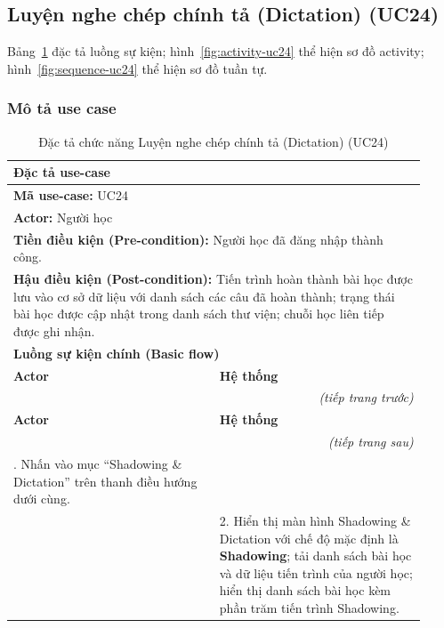\subsection{Luyện nghe chép chính tả (Dictation) (UC24)}
Bảng~\ref{tab:uc24_spec} đặc tả luồng sự kiện; hình~\ref{fig:activity-uc24} thể hiện sơ đồ activity; hình~\ref{fig:sequence-uc24} thể hiện sơ đồ tuần tự.
\subsubsection{Mô tả use case}
\renewcommand{\arraystretch}{1.3}
\begin{longtable}{|p{0.46\linewidth}|p{0.46\linewidth}|}
    \caption{Đặc tả chức năng Luyện nghe chép chính tả (Dictation) (UC24)} \label{tab:uc24_spec} \\
    \hline
    \multicolumn{2}{|l|}{\textbf{Đặc tả use-case}} \\ \hline
    \multicolumn{2}{|l|}{\textbf{Mã use-case:} UC24} \\ \hline
    \multicolumn{2}{|l|}{\textbf{Actor:} Người học} \\ \hline
    \multicolumn{2}{|p{0.88\linewidth}|}{\textbf{Tiền điều kiện (Pre-condition):} Người học đã đăng nhập thành công.} \\ \hline
    \multicolumn{2}{|p{0.88\linewidth}|}{\textbf{Hậu điều kiện (Post-condition):} Tiến trình hoàn thành bài học được lưu vào cơ sở dữ liệu với danh sách các câu đã hoàn thành; trạng thái bài học được cập nhật trong danh sách thư viện; chuỗi học liên tiếp được ghi nhận.} \\ \hline
    \multicolumn{2}{|l|}{\textbf{Luồng sự kiện chính (Basic flow)}} \\ \hline
    \textbf{Actor} & \textbf{Hệ thống} \\ \hline
    \endfirsthead
    \multicolumn{2}{r}{\textit{(tiếp trang trước)}} \\
    \hline
    \textbf{Actor} & \textbf{Hệ thống} \\ \hline
    \endhead
    \hline
    \multicolumn{2}{r}{\textit{(tiếp trang sau)}} \\
    \endfoot
    \hline
    \endlastfoot
    1. Nhấn vào mục ``Shadowing \& Dictation'' trên thanh điều hướng dưới cùng. & \\ \hline
    & 2. Hiển thị màn hình Shadowing \& Dictation với chế độ mặc định là \textbf{Shadowing}; tải danh sách bài học và dữ liệu tiến trình của người học; hiển thị danh sách bài học kèm phần trăm tiến trình Shadowing. \\ \hline

\end{longtable}
